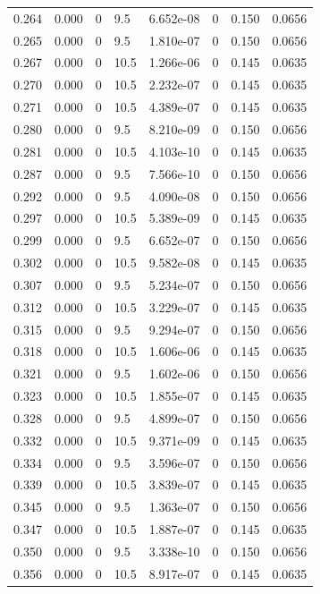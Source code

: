 \documentclass[preview]{standalone}
\begin{document}
{{{\begin{tabular}{L{1.2cm}C{1.2cm} C{0.3cm}C{0.5cm} C{1.4cm}C{1.4cm} C{1.4cm}C{1.4cm}}
  0.264  &  0.000  & 0     & 9.5 &  6.652e-08  & 0  & 0.150 &  0.0656   \\ 
  0.265  &  0.000  & 0     & 9.5 &  1.810e-07  & 0  & 0.150 &  0.0656   \\ 
  0.267  &  0.000  & 0     & 10.5 &  1.266e-06  & 0  & 0.145 &  0.0635   \\ 
  0.270  &  0.000  & 0     & 10.5 &  2.232e-07  & 0  & 0.145 &  0.0635   \\ 
  0.271  &  0.000  & 0     & 10.5 &  4.389e-07  & 0  & 0.145 &  0.0635   \\ 
  0.280  &  0.000  & 0     & 9.5 &  8.210e-09  & 0  & 0.150 &  0.0656   \\ 
  0.281  &  0.000  & 0     & 10.5 &  4.103e-10  & 0  & 0.145 &  0.0635   \\ 
  0.287  &  0.000  & 0     & 9.5 &  7.566e-10  & 0  & 0.150 &  0.0656   \\ 
  0.292  &  0.000  & 0     & 9.5 &  4.090e-08  & 0  & 0.150 &  0.0656   \\ 
  0.297  &  0.000  & 0     & 10.5 &  5.389e-09  & 0  & 0.145 &  0.0635   \\ 
  0.299  &  0.000  & 0     & 9.5 &  6.652e-07  & 0  & 0.150 &  0.0656   \\ 
  0.302  &  0.000  & 0     & 10.5 &  9.582e-08  & 0  & 0.145 &  0.0635   \\ 
  0.307  &  0.000  & 0     & 9.5 &  5.234e-07  & 0  & 0.150 &  0.0656   \\ 
  0.312  &  0.000  & 0     & 10.5 &  3.229e-07  & 0  & 0.145 &  0.0635   \\ 
  0.315  &  0.000  & 0     & 9.5 &  9.294e-07  & 0  & 0.150 &  0.0656   \\ 
  0.318  &  0.000  & 0     & 10.5 &  1.606e-06  & 0  & 0.145 &  0.0635   \\ 
  0.321  &  0.000  & 0     & 9.5 &  1.602e-06  & 0  & 0.150 &  0.0656   \\ 
  0.323  &  0.000  & 0     & 10.5 &  1.855e-07  & 0  & 0.145 &  0.0635   \\ 
  0.328  &  0.000  & 0     & 9.5 &  4.899e-07  & 0  & 0.150 &  0.0656   \\ 
  0.332  &  0.000  & 0     & 10.5 &  9.371e-09  & 0  & 0.145 &  0.0635   \\ 
  0.334  &  0.000  & 0     & 9.5 &  3.596e-07  & 0  & 0.150 &  0.0656   \\ 
  0.339  &  0.000  & 0     & 10.5 &  3.839e-07  & 0  & 0.145 &  0.0635   \\ 
  0.345  &  0.000  & 0     & 9.5 &  1.363e-07  & 0  & 0.150 &  0.0656   \\ 
  0.347  &  0.000  & 0     & 10.5 &  1.887e-07  & 0  & 0.145 &  0.0635   \\ 
  0.350  &  0.000  & 0     & 9.5 &  3.338e-10  & 0  & 0.150 &  0.0656   \\ 
  0.356  &  0.000  & 0     & 10.5 &  8.917e-07  & 0  & 0.145 &  0.0635   \\ 
\hline 
\end{tabular} 

}}}
\end{document}
